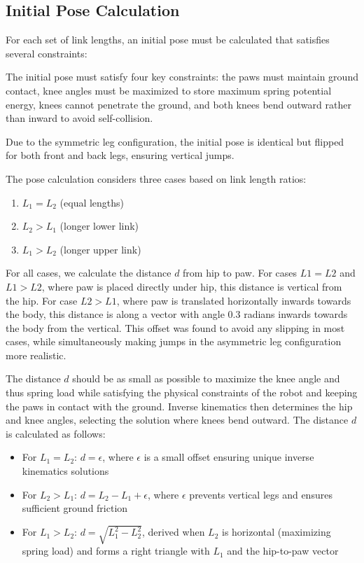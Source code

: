 \subsection{Initial Pose Calculation}
For each set of link lengths, an initial pose must be calculated that satisfies several constraints:

The initial pose must satisfy four key constraints: the paws must maintain ground contact, knee angles must be maximized to store maximum spring potential energy, knees cannot penetrate the ground, and both knees bend outward rather than inward to avoid self-collision.

Due to the symmetric leg configuration, the initial pose is identical but flipped for both front and back legs, ensuring vertical jumps.

The pose calculation considers three cases based on link length ratios:

\begin{enumerate}
    \item \(L_1 = L_2\) (equal lengths)
    \item \(L_2 > L_1\) (longer lower link)
    \item \(L_1 > L_2\) (longer upper link)
\end{enumerate}

For all cases, we calculate the distance \(d\) from hip to paw. For cases $L1=L2$ and $L1>L2$, where paw is placed directly under hip, this distance is vertical from the hip. For case $L2>L1$, where paw is translated horizontally inwards towards the body, this distance is along a vector with angle 0.3 radians inwards towards the body from the vertical. This offset was found to avoid any slipping in most cases, while simultaneously making jumps in the asymmetric leg configuration more realistic. 

The distance \(d\) should be as small as possible to maximize the knee angle and thus spring load while satisfying the physical constraints of the robot and keeping the paws in contact with the ground. Inverse kinematics then determines the hip and knee angles, selecting the solution where knees bend outward. The distance \(d\) is calculated as follows:

\begin{itemize}
    \item For \(L_1 = L_2\): \(d = \epsilon\), where \(\epsilon\) is a small offset ensuring unique inverse kinematics solutions
    \item For \(L_2 > L_1\): \(d = L_2 - L_1 + \epsilon\), where \(\epsilon\) prevents vertical legs and ensures sufficient ground friction
    \item For \(L_1 > L_2\): \(d = \sqrt{L_1^2 - L_2^2}\), derived when \(L_2\) is horizontal (maximizing spring load) and forms a right triangle with \(L_1\) and the hip-to-paw vector
\end{itemize}

